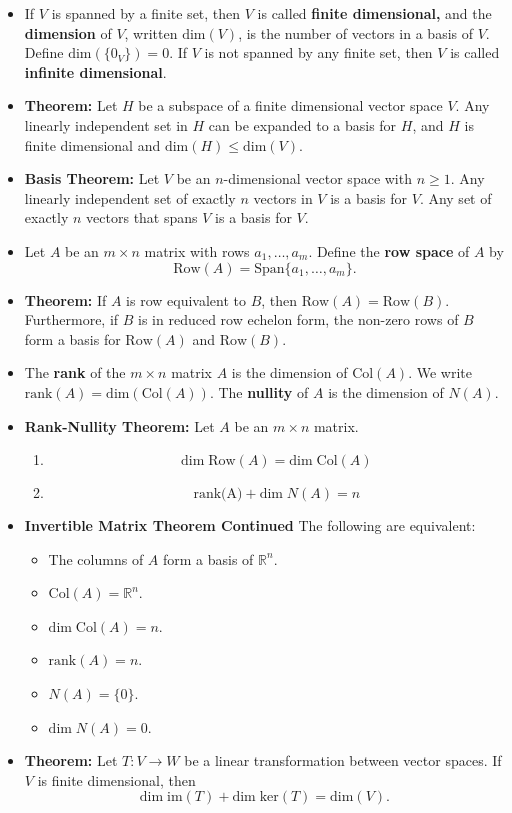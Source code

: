\begin{itemize}
\item If $V$ is spanned by a finite set, then $V$ is called {\bf finite dimensional,} and the {\bf dimension} of $V$, written $\text{dim}(V)$, is the number of vectors in a basis of $V$. Define $\text{dim}(\{0_V\})=0$. If $V$ is not spanned by any finite set, then $V$ is called {\bf infinite dimensional}.
\item {\bf Theorem:} Let $H$ be a subspace of a finite dimensional vector space $V$. Any linearly independent set in $H$ can be expanded to a basis for $H$, and $H$ is finite dimensional and $\text{dim}(H)\leq \text{dim}(V)$.
\item {\bf Basis Theorem:} Let $V$ be an $n$-dimensional vector space with $n\geq 1$. Any linearly independent set of exactly $n$ vectors in $V$ is a basis for $V$. Any set of exactly $n$ vectors that spans $V$ is a basis for $V$.
\item Let $A$ be an $m\times n$ matrix with rows $a_1, \dots, a_m$. Define the {\bf row space} of $A$ by $$\text{Row}(A)=\text{Span}\{a_1, \dots, a_m\}.$$
\item {\bf Theorem:} If $A$ is row equivalent to $B$, then $\text{Row}(A)=\text{Row}(B)$. Furthermore, if $B$ is in reduced row echelon form, the non-zero rows of $B$ form a basis for $\text{Row}(A)$ and $\text{Row}(B)$.
\item The {\bf rank} of the $m\times n$ matrix $A$ is the dimension of $\text{Col}(A)$. We write $\text{rank}(A)=\text{dim}(\text{Col}(A))$. The {\bf nullity} of $A$ is the dimension of $N(A)$. 
\item {\bf Rank-Nullity Theorem:} Let $A$ be an $m\times n$ matrix.
\begin{enumerate}
\item $$\text{dim} \;\text{Row}(A)= \text{dim} \;\text{Col}(A)$$
\item $$\text{rank(A)}+\text{dim} \;N(A) =n$$
\end{enumerate}
\item {\bf Invertible Matrix Theorem Continued} The following are equivalent:
\begin{itemize}
\item[m.] The columns of $A$ form a basis of $\mathbb{R}^n$.
\item[n.] $\text{Col}(A)=\mathbb{R}^n$.
\item[o.] $\text{dim} \; \text{Col}(A)=n$.
\item[p.] $\text{rank}(A)=n$.
\item[q.] $N(A)=\{0\}$.
\item[r.] $\text{dim}\; N(A) =0$.
\end{itemize}
\item {\bf Theorem:} Let $T: V \to W$ be a linear transformation between vector spaces. If $V$ is finite dimensional, then $$\text{dim} \; \text{im}(T) + \text{dim} \; \text{ker}(T) =\text{dim}(V).$$
\end{itemize}

